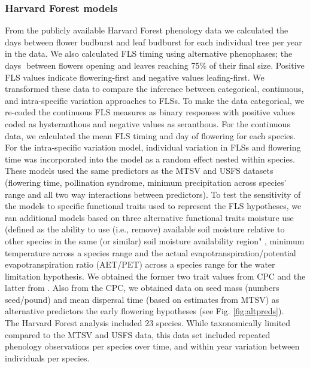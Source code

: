 \documentclass[11pt]{article}
\begin{document}
  \subsubsection*{Harvard Forest models}
  \noindnent From the publicly available Harvard Forest phenology data \citep{OKeefe2015} we calculated the days between flower budburst and leaf budburst for each individual tree per year in the data. We also calculated FLS timing using alternative phenophases; the days between flowers opening and leaves reaching 75\% of their final size. Positive FLS values indicate flowering-first and negative values leafing-first. We transformed these data to compare the inference between categorical, continuous, and intra-specific variation approaches to FLSs. To make the data categorical, we re-coded the continuous FLS measures as binary responses with positive values coded as hysteranthous and negative values as seranthous. For the continuous data, we calculated the mean FLS timing and day of flowering for each species. For the intra-specific variation model, individual variation in FLSs and flowering time was incorporated into the model as a random effect nested within species. These models used the same predictors as the MTSV and USFS datasets (flowering time, pollination syndrome, minimum precipitation across species' range and all two way interactions between predictors). To test the sensitivity of the models to specific functional traits used to represent the FLS hypotheses, we ran additional models based on three alternative functional traits moisture use (defined as the ability to use (i.e., remove) available soil moisture relative to other species in the same (or similar) soil moisture availability region" \citep{usdancrs}, minimum temperature across a species range and the actual evapotranspiration/potential evapotranspiration ratio (AET/PET) across a species range for the water limitation hypothesis. We obtained the former two trait values from  CPC and the latter from \citet{Thomspson2012}. Also from the CPC, we obtained data on seed mass (numbers seed/pound) and mean dispersal time (based on estimates from MTSV) as alternative predictors the early flowering hypotheses (see Fig. \ref{fig:altpreds}).\\
  
  \noindent The Harvard Forest analysis included 23 species. While taxonomically limited compared to the MTSV and USFS data, this data set included repeated phenology observations per species over time, and within year variation between individuals per species. \\ 
  
\end{document}

